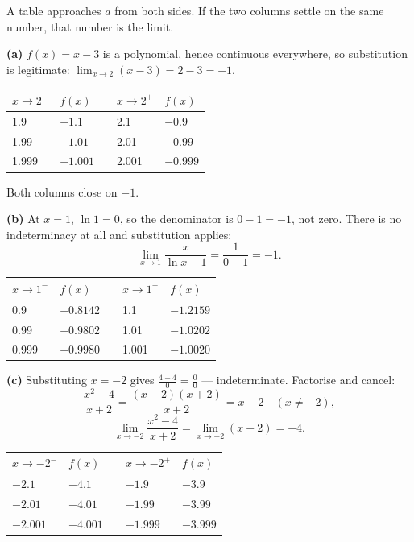 \begin{solution}
A table approaches $a$ from both sides. If the two columns settle on the same
number, that number is the limit.

\medskip
\textbf{(a)} $f(x)=x-3$ is a polynomial, hence continuous everywhere, so
substitution is legitimate: $\lim_{x\to2}(x-3)=2-3=-1$.

\begin{center}
\small\sffamily
\begin{tabular}{@{}C{1.8cm} C{1.8cm} C{1.0cm} C{1.8cm} C{1.8cm}@{}}
\toprule
$x\to 2^{-}$ & $f(x)$ & & $x\to 2^{+}$ & $f(x)$ \\
   & $-1.1$   & & 2.1   & $-0.9$ \\
1.99  & $-1.01$  & & 2.01  & $-0.99$ \\
1.999 & $-1.001$ & & 2.001 & $-0.999$ \\
\bottomrule
\end{tabular}
\end{center}
Both columns close on $-1$.

\medskip
\textbf{(b)} At $x=1$, $\ln 1=0$, so the denominator is $0-1=-1$, not zero.
There is no indeterminacy at all and substitution applies:
\[
\lim_{x\to1}\frac{x}{\ln x-1}=\frac{1}{0-1}=-1 .
\]

\begin{center}
\small\sffamily
\begin{tabular}{@{}C{1.8cm} C{2.2cm} C{1.0cm} C{1.8cm} C{2.2cm}@{}}
\toprule
$x\to 1^{-}$ & $f(x)$ & & $x\to 1^{+}$ & $f(x)$ \\
   & $-0.8142$ & & 1.1   & $-1.2159$ \\
0.99  & $-0.9802$ & & 1.01  & $-1.0202$ \\
0.999 & $-0.9980$ & & 1.001 & $-1.0020$ \\
\bottomrule
\end{tabular}
\end{center}

\medskip
\textbf{(c)} Substituting $x=-2$ gives $\tfrac{4-4}{0}=\tfrac00$ ---
indeterminate. Factorise and cancel:
\[
\frac{x^{2}-4}{x+2}=\frac{(x-2)(x+2)}{x+2}=x-2 \quad (x\neq -2),
\]
\[
\lim_{x\to-2}\frac{x^{2}-4}{x+2}=\lim_{x\to-2}(x-2)=-4 .
\]

\begin{center}
\small\sffamily
\begin{tabular}{@{}C{1.8cm} C{1.8cm} C{1.0cm} C{1.8cm} C{1.8cm}@{}}
\toprule
$x\to -2^{-}$ & $f(x)$ & & $x\to -2^{+}$ & $f(x)$ \\
\midrule
$-2.1$   & $-4.1$   & & $-1.9$   & $-3.9$ \\
$-2.01$  & $-4.01$  & & $-1.99$  & $-3.99$ \\
$-2.001$ & $-4.001$ & & $-1.999$ & $-3.999$ \\
\bottomrule
\end{tabular}
\end{center}

\end{solution}

